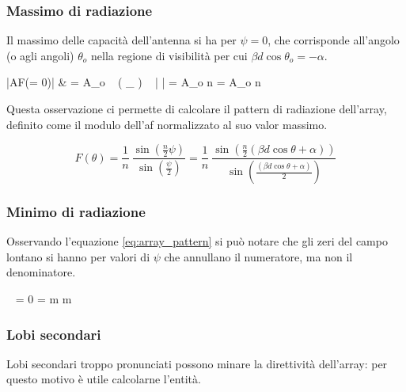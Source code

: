 		\subsubsection{Massimo di radiazione}
			Il massimo delle capacità dell'antenna si ha per $\psi = 0$, che corrisponde all'angolo (o agli angoli) $\theta_o$ nella regione di visibilità per cui $\beta d \cos \theta_o = -\alpha$.
			
			\begin{esp}
				|AF(\psi = 0)| 
					& = A_o 
						~ \left( \lim_{\psi {}} \frac{ \sin(\frac{n}{2} \psi) }{ \sin(\frac{\psi}{2}) } \right)
						~ \left| \frac{ e^{\jmath \frac{n-1}{2} \psi} }{ e^{\jmath \psi} } \right| 
						= A_o \cdot n \cdot 1 = A_o \cdot n
			\end{esp}

			Questa osservazione ci permette di calcolare il pattern di radiazione dell'array, definito come il modulo dell'\gls{af} normalizzato al suo valor massimo.
			
			\begin{equation} \label{eq:array_pattern}
				F(\theta) 
					= \frac{1}{n} ~ 
					= \frac{1}{n} ~ \frac{
						\sin \left(
							\frac{n}{2} (\beta d \cos \theta + \alpha)
						\right) 
					}{
						\sin \left(
							\frac{(\beta d \cos \theta + \alpha)}{2}
						\right)
					}
			\end{equation}
			
		\subsubsection{Minimo di radiazione}
			Osservando l'equazione \ref{eq:array_pattern} si può notare che gli zeri del campo lontano si hanno per valori di $\psi$ che annullano il numeratore, ma non il denominatore.
			
			\begin{esp}
				 ~ \frac{\sin(\frac{n}{2} \psi) }{ \sin( \frac{\psi}{2} ) } = 0
				\Leftrightarrow 
					 \psi = \pm m \pi \quad \forall m \neq 0
			\end{esp}
			
		\subsubsection{Lobi secondari}
			Lobi secondari troppo pronunciati possono minare la direttività dell'array: per questo motivo è utile calcolarne l'entità.
			
